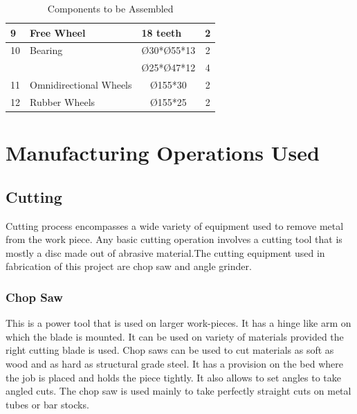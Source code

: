 \begin{table}[!ht]
\begin{tabular}{|l|l|l|c|}
\hline
9                                                 & Free Wheel               & 18 teeth                                                  & 2                              \\ 
\hline
\multirow{}{}{10}                               & \multirow{}{}{Bearing} & Ø30*Ø55*13                                                & 2                              \\ 
\cline{3-4}
                                                  &                          & Ø25*Ø47*12                                                & 4                              \\ 
\hline
11                                                & Omnidirectional Wheels   & \multicolumn{1}{c|}{Ø155*30}                              & 2                              \\ 
\hline
12                                                & Rubber Wheels            & \multicolumn{1}{c|}{Ø155*25}                              & 2                              \\
\hline
\end{tabular}
%
\caption{Components to be Assembled}
\label{tab:Components to be Assembled}
\end{table}













\section{Manufacturing Operations Used} \label{Manufacturing Operations Used}
\subsection{Cutting} \label{Cutting}
Cutting process encompasses a wide variety of equipment used to remove metal from the work piece. Any basic cutting operation involves a cutting tool that is mostly a disc made out of abrasive material.The cutting equipment used in fabrication of this project are chop saw and angle grinder.

\subsubsection{Chop Saw} \label{Chop Saw}
This is a power tool that is used on larger work-pieces. It has a hinge like arm on which the blade is mounted. It can be used on variety of materials provided the right cutting blade is used. Chop saws can be used to cut materials as soft as wood and as hard as structural grade steel. It has a provision on the bed where the job is placed and holds the piece tightly. It also allows to set angles to take angled cuts. The chop saw is used mainly to take perfectly straight cuts on metal tubes or bar stocks.

